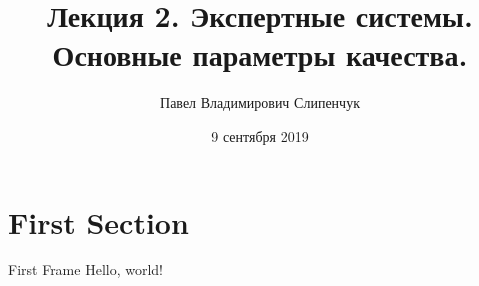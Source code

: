 \documentclass{beamer}
\title{Лекция 2. Экспертные системы. Основные параметры качества.}
\date{9 сентября 2019}
\author{Павел Владимирович Слипенчук}
\institute{Москва, МГТУ им.Бауманка,\\ каф.ИУ-8, КИБ}
\begin{document}
  \maketitle
    
  \section{First Section}
  \begin{frame}{First Frame}
    Hello, world!
  \end{frame}
\end{document}
